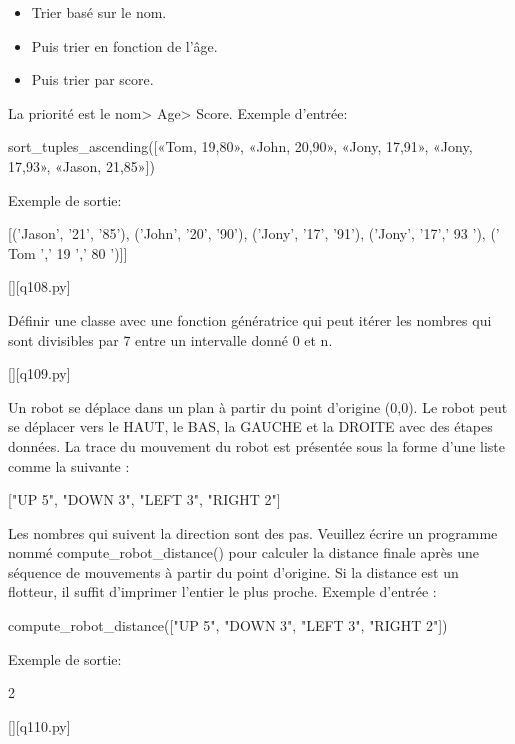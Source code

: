 		\begin{itemize}
		\item Trier basé sur le nom.
		\item Puis trier en fonction de l'âge.
		\item Puis trier par score.
		\end{itemize}
		
		La priorité est le nom> Age> Score.\newline
		Exemple d'entrée:
		
		sort\_tuples\_ascending([«Tom, 19,80», «John, 20,90», «Jony, 17,91», «Jony, 17,93», «Jason, 21,85»])
		
		Exemple de sortie:
		
		[('Jason', '21', '85'), ('John', '20', '90'), ('Jony', '17', '91'), ('Jony', '17',' 93 '), (' Tom ',' 19 ',' 80 ')]]
		\par
		\renewcommand{\nomfichier}{q108.py}
		\begin{solution}
		    \pythonfile{\chemincode \nomfichier}[][\nomfichier]
		\end{solution}
        
		\question
		Définir une classe avec une fonction génératrice qui peut itérer les nombres qui sont divisibles par 7 entre un intervalle donné 0 et n.
		\par
		\renewcommand{\nomfichier}{q109.py}
		\begin{solution}
		    \pythonfile{\chemincode \nomfichier}[][\nomfichier]
		\end{solution}
        
		\question
		Un robot se déplace dans un plan à partir du point d'origine (0,0). Le robot peut se déplacer vers le HAUT, le BAS, la GAUCHE et la DROITE avec des étapes données. La trace du mouvement du robot est présentée sous la forme d'une liste comme la suivante :
		
		["UP 5", "DOWN 3", "LEFT 3", "RIGHT 2"]
		
		Les nombres qui suivent la direction sont des pas. Veuillez écrire un programme nommé compute\_robot\_distance() pour calculer la distance finale après une séquence de mouvements à partir du point d'origine. Si la distance est un flotteur, il suffit d'imprimer l'entier le plus proche.
		Exemple d'entrée :
		
		compute\_robot\_distance(["UP 5", "DOWN 3", "LEFT 3", "RIGHT 2"])
		
		Exemple de sortie:
		
		2
		\par
		\renewcommand{\nomfichier}{q110.py}
		\begin{solution}
		    \pythonfile{\chemincode \nomfichier}[][\nomfichier]
		\end{solution}
        
